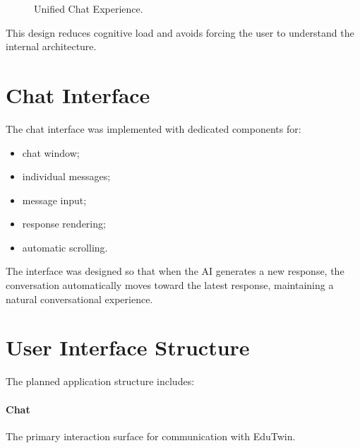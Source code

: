\documentclass[12pt,a4paper]{article}
\begin{document}
\begin{figure}[htbp]
\centering
{}
\caption{Unified Chat Experience.}
\end{figure}

This design reduces cognitive load and avoids forcing the user to understand the internal architecture.

\section{Chat Interface}
The chat interface was implemented with dedicated components for:
\begin{itemize}[noitemsep,topsep=2pt]
    \item chat window;
    \item individual messages;
    \item message input;
    \item response rendering;
    \item automatic scrolling.
\end{itemize}

The interface was designed so that when the AI generates a new response, the conversation automatically moves toward the latest response, maintaining a natural conversational experience.

\section{User Interface Structure}
The planned application structure includes:

\paragraph{Chat} The primary interaction surface for communication with EduTwin.
\end{document}
